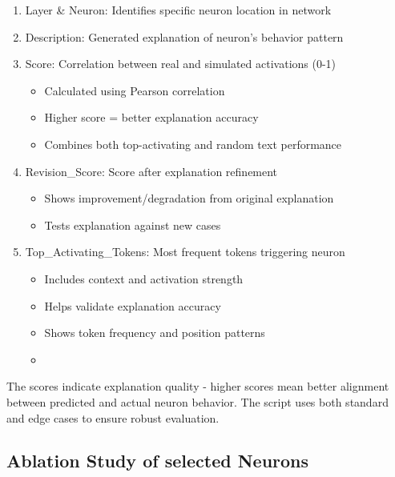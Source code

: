\documentclass[runninghheads]{llncs}
\begin{document}
\begin{enumerate}
            \item Layer \& Neuron: Identifies specific neuron location in network
            \item Description: Generated explanation of neuron's behavior pattern
            \item Score: Correlation between real and simulated activations (0-1)
            \begin{itemize}
                \item Calculated using Pearson correlation
                \item Higher score = better explanation accuracy
                \item Combines both top-activating and random text performance
            \end{itemize}
            \item Revision\_Score: Score after explanation refinement
            \begin{itemize}
                \item Shows improvement/degradation from original explanation
                \item Tests explanation against new cases
            \end{itemize}
            \item Top\_Activating\_Tokens: Most frequent tokens triggering neuron
            \begin{itemize}
                \item Includes context and activation strength
                \item Helps validate explanation accuracy
                \item Shows token frequency and position patterns
        \item 
    \end{itemize}
\end{enumerate}
The scores indicate explanation quality - higher scores mean better alignment between predicted and actual neuron behavior. The script uses both standard and edge cases to ensure robust evaluation.

\subsection{Ablation Study of selected Neurons}
\end{document}
